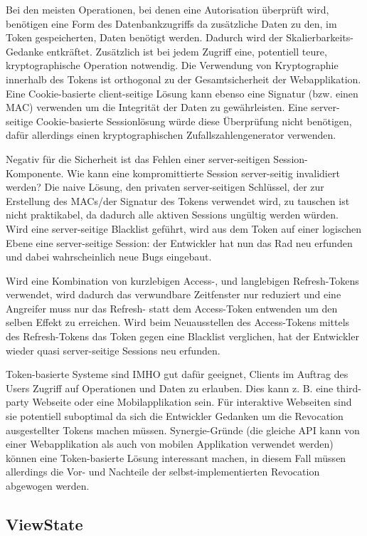 Bei den meisten Operationen, bei denen eine Autorisation überprüft wird, benötigen eine Form des Datenbankzugriffs da zusätzliche Daten zu den, im Token gespeicherten, Daten benötigt werden. Dadurch wird der Skalierbarkeits-Gedanke entkräftet. Zusätzlich ist bei jedem Zugriff eine, potentiell teure, kryptographische Operation notwendig. Die Verwendung von Kryptographie innerhalb des Tokens ist orthogonal zu der Gesamtsicherheit der Webapplikation. Eine Cookie-basierte client-seitige Lösung kann ebenso eine Signatur (bzw. einen MAC) verwenden um die Integrität der Daten zu gewährleisten. Eine server-seitige Cookie-basierte Sessionlösung würde diese Überprüfung nicht benötigen, dafür allerdings einen kryptographischen Zufallszahlengenerator verwenden.

Negativ für die Sicherheit ist das Fehlen einer server-seitigen Session-Komponente. Wie kann eine kompromittierte Session server-seitig invalidiert werden? Die naive Lösung, den privaten server-seitigen Schlüssel, der zur Erstellung des MACs/der Signatur des Tokens verwendet wird, zu tauschen ist nicht praktikabel, da dadurch alle aktiven Sessions ungültig werden würden. Wird eine server-seitige Blacklist geführt, wird aus dem Token auf einer logischen Ebene eine server-seitige Session: der Entwickler hat nun das Rad neu erfunden und dabei wahrscheinlich neue Bugs eingebaut.

Wird eine Kombination von kurzlebigen Access-, und langlebigen Refresh-Tokens verwendet, wird dadurch das verwundbare Zeitfenster nur reduziert und eine Angreifer muss nur das Refresh- statt dem Access-Token entwenden um den selben Effekt zu erreichen. Wird beim Neuausstellen des Access-Tokens mittels des Refresh-Tokens das Token gegen eine Blacklist verglichen, hat der Entwickler wieder quasi server-seitige Sessions neu erfunden.

Token-basierte Systeme sind IMHO gut dafür geeignet, Clients im Auftrag des Users Zugriff auf Operationen und Daten zu erlauben. Dies kann z. B. eine third-party Webseite oder eine Mobilapplikation sein. Für interaktive Webseiten sind sie potentiell suboptimal da sich die Entwickler Gedanken um die Revocation ausgestellter Tokens machen müssen. Synergie-Gründe (die gleiche API kann von einer Webapplikation als auch von mobilen Applikation verwendet werden) können eine Token-basierte Lösung interessant machen, in diesem Fall müssen allerdings die Vor- und Nachteile der selbst-implementierten Revocation abgewogen werden.

\subsection{ViewState}


